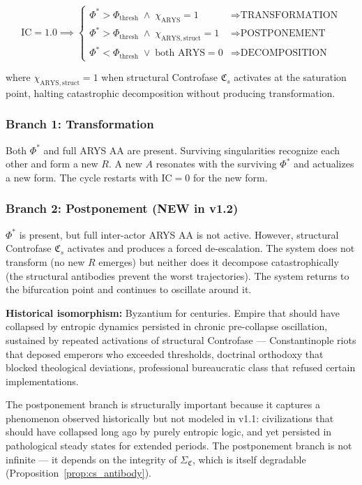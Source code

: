 \documentclass[12pt,a4paper]{article}
\newcommand{\IC}{\mathrm{IC}}
\newcommand{\Phistar}{\Phi^{*}}
\newcommand{\Phithresh}{\Phi_{\mathrm{thresh}}}
\newcommand{\Mpot}{A}
\newcommand{\CFs}{\mathfrak{C}_s}        %
\newcommand{\SigmaCF}{\Sigma_{\mathfrak{C}}}  %
\begin{document}
\begin{equation}\label{eq:triple_bifurcation}
\IC = 1.0 \implies 
\begin{cases}
\Phistar > \Phithresh\;\wedge\;\chi_{\mathrm{ARYS}} = 1 & \Longrightarrow \text{TRANSFORMATION} \\
\Phistar > \Phithresh\;\wedge\;\chi_{\mathrm{ARYS,struct}} = 1 & \Longrightarrow \text{POSTPONEMENT} \\
\Phistar < \Phithresh\;\vee\;\text{both ARYS} = 0 & \Longrightarrow \text{DECOMPOSITION}
\end{cases}
\end{equation}

\noindent where $\chi_{\mathrm{ARYS,struct}} = 1$ when structural Controfase $\CFs$ activates at the saturation point, halting catastrophic decomposition without producing transformation.

\subsubsection{Branch 1: Transformation}

Both $\Phistar$ and full ARYS AA are present. Surviving singularities recognize each other and form a new $R$. A new $\Mpot$ resonates with the surviving $\Phistar$ and actualizes a new form. The cycle restarts with $\IC = 0$ for the new form.

\subsubsection{Branch 2: Postponement (NEW in v1.2)}

$\Phistar$ is present, but full inter-actor ARYS AA is not active. However, structural Controfase $\CFs$ activates and produces a forced de-escalation. The system does not transform (no new $R$ emerges) but neither does it decompose catastrophically (the structural antibodies prevent the worst trajectories). The system returns to the bifurcation point and continues to oscillate around it.

\textbf{Historical isomorphism:} Byzantium for centuries. Empire that should have collapsed by entropic dynamics persisted in chronic pre-collapse oscillation, sustained by repeated activations of structural Controfase --- Constantinople riots that deposed emperors who exceeded thresholds, doctrinal orthodoxy that blocked theological deviations, professional bureaucratic class that refused certain implementations.

The postponement branch is structurally important because it captures a phenomenon observed historically but not modeled in v1.1: civilizations that should have collapsed long ago by purely entropic logic, and yet persisted in pathological steady states for extended periods. The postponement branch is not infinite --- it depends on the integrity of $\SigmaCF$, which is itself degradable (Proposition~\ref{prop:cs_antibody}).
\end{document}
